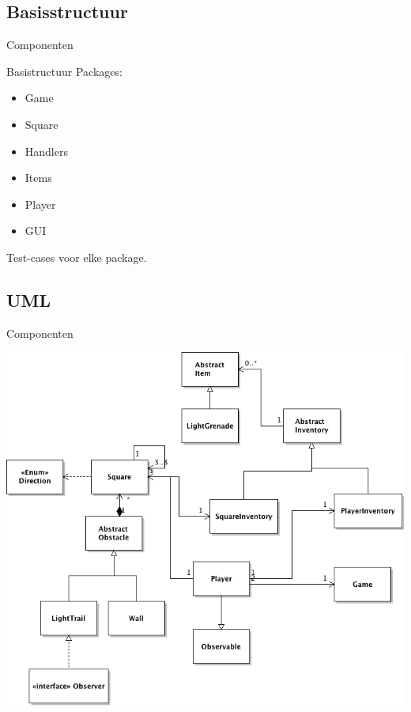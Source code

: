 \documentclass[t]{beamer}
\begin{document}
\subsection{Basisstructuur}
\begin{frame}{Componenten}
\begin{multicols}{2}
\tableofcontents[currentsection]
\end{multicols}
\end{frame}

\begin{frame}{Basistructuur}
Packages:
\begin{itemize}
	\item Game
	\item Square
	\item Handlers
	\item Items
	\item Player
	\item GUI
\end{itemize}
Test-cases voor elke package.
\end{frame}


\subsection{UML}
\begin{frame}{Componenten}
\begin{multicols}{2}
\tableofcontents[currentsection]
\end{multicols}
\end{frame}

\begin{frame}[plain]
\begin{center}
\includegraphics[width= 0.9\linewidth]{../uml/SimpleOverview.png}
\end{center}
\end{frame}
\end{document}
